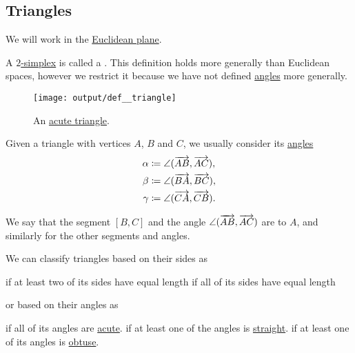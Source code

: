 \subsection{Triangles}\label{subsec:triangles}

We will work in the \hyperref[def:euclidean_plane]{Euclidean plane}.

\begin{definition}\label{def:triangle}
  A \hyperref[def:simplex]{\( 2 \)-simplex} is called a . This definition holds more generally than Euclidean spaces, however we restrict it because we have not defined \hyperref[def:angle]{angles} more generally.

  \begin{figure}[!ht]
    \centering
    \texttt{[image: output/def\_\_triangle]}
    \caption{An \hyperref[def:triangle/measure/acute]{acute triangle}.}\label{fig:def:triangle}
  \end{figure}

  Given a triangle with vertices \( A \), \( B \) and \( C \), we usually consider its \hyperref[def:angle]{ angles}
  \begin{align*}
    \alpha &\coloneqq \angle(\overrightarrow{AB}, \overrightarrow{AC}), \\
    \beta  &\coloneqq \angle(\overrightarrow{BA}, \overrightarrow{BC}), \\
    \gamma &\coloneqq \angle(\overrightarrow{CA}, \overrightarrow{CB}).
  \end{align*}

  We say that the segment \( [B, C] \) and the angle \( \angle(\overrightarrow{AB}, \overrightarrow{AC}) \) are  to \( A \), and similarly for the other segments and angles.

  We can classify triangles based on their sides as
  \begin{thmenum}
      if at least two of its sides have equal length
      if all of its sides have equal length
  \end{thmenum}
  or based on their angles as
  \begin{thmenum}
      if all of its angles are \hyperref[def:angle/measure/acute]{acute}.
      if at least one of the angles is \hyperref[def:angle/measure/straight]{straight}.
      if at least one of its angles is \hyperref[def:angle/measure/obtuse]{obtuse}.
  \end{thmenum}
\end{definition}

